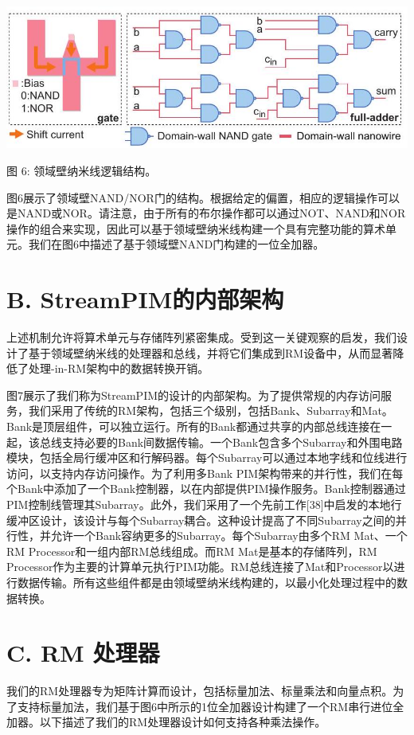 \documentclass[10pt]{article}
\begin{document}
\begin{center}
\includegraphics[max width=\textwidth]{2024_05_12_abeba8a85da5b5ec4c7bg-04}
\end{center}
图 6: 领域壁纳米线逻辑结构。

图6展示了领域壁NAND/NOR门的结构。根据给定的偏置，相应的逻辑操作可以是NAND或NOR。请注意，由于所有的布尔操作都可以通过NOT、NAND和NOR操作的组合来实现，因此可以基于领域壁纳米线构建一个具有完整功能的算术单元。我们在图6中描述了基于领域壁NAND门构建的一位全加器。

\section*{B. StreamPIM的内部架构}

上述机制允许将算术单元与存储阵列紧密集成。受到这一关键观察的启发，我们设计了基于领域壁纳米线的处理器和总线，并将它们集成到RM设备中，从而显著降低了处理-in-RM架构中的数据转换开销。

图7展示了我们称为StreamPIM的设计的内部架构。为了提供常规的内存访问服务，我们采用了传统的RM架构，包括三个级别，包括Bank、Subarray和Mat。Bank是顶层组件，可以独立运行。所有的Bank都通过共享的内部总线连接在一起，该总线支持必要的Bank间数据传输。一个Bank包含多个Subarray和外围电路模块，包括全局行缓冲区和行解码器。每个Subarray可以通过本地字线和位线进行访问，以支持内存访问操作。为了利用多Bank PIM架构带来的并行性，我们在每个Bank中添加了一个Bank控制器，以在内部提供PIM操作服务。Bank控制器通过PIM控制线管理其Subarray。此外，我们采用了一个先前工作[38]中启发的本地行缓冲区设计，该设计与每个Subarray耦合。这种设计提高了不同Subarray之间的并行性，并允许一个Bank容纳更多的Subarray。每个Subarray由多个RM Mat、一个RM Processor和一组内部RM总线组成。而RM Mat是基本的存储阵列，RM Processor作为主要的计算单元执行PIM功能。RM总线连接了Mat和Processor以进行数据传输。所有这些组件都是由领域壁纳米线构建的，以最小化处理过程中的数据转换。







\section*{C. RM 处理器}
我们的RM处理器专为矩阵计算而设计，包括标量加法、标量乘法和向量点积。为了支持标量加法，我们基于图6中所示的1位全加器设计构建了一个RM串行进位全加器。以下描述了我们的RM处理器设计如何支持各种乘法操作。
\end{document}
